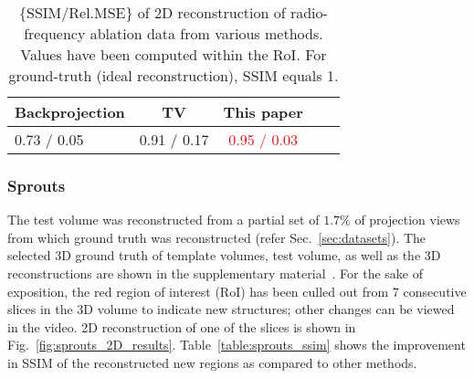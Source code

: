\documentclass[journal]{IEEEtran}
\begin{document}
\begin{comment}
\begin{figure}[!h]
\centering
\subcaptionbox{Test}{\fcolorbox{white}{green}{\texttt{[image: ../images/tmh/RFA2/post\_TCI/very\_few\_views/test\_zoomed.png]}}}\hfill
\subcaptionbox{Backprojection\\no prior}{\texttt{[image: ../images/tmh/RFA2/post\_TCI/very\_few\_views/fbp\_zoomed.png]}}\hfill
\subcaptionbox{TV, no prior}{\texttt{[image: ../images/tmh/RFA2/post\_TCI/very\_few\_views/tv\_zoomed.png]}}\hfill
\subcaptionbox{This paper}{\texttt{[image: ../images/tmh/RFA2/post\_TCI/very\_few\_views/weighted\_pca\_zoomed.png]}}
\caption{A zoomed-in version of the regions around the RoI of the reconstructions shown in Fig.~\ref{fig:tmh_2D_results}.}
\label{fig:tmh_2D_zoomed_results}
\end{figure}
\end{comment}

\begin{table}[!h]
  \centering
  \caption{\{SSIM/Rel.MSE\} of 2D reconstruction of radio-frequency ablation data from various methods. Values have been computed within the RoI. For ground-truth (ideal reconstruction), SSIM equals 1.}
\begin{tabular}{|l|c|c|c|c|}
\hline \textbf{Backprojection} & \textbf{TV} &
\textbf{This paper} \\ \hline  0.73 / 0.05
& 0.91 / 0.17 & \textcolor{red}{0.95 / 0.03} \\ \hline 
\end{tabular}
\label{table:tmh_ssim}
\end{table}



\subsubsection{\textbf{Sprouts}}
\label{Sec:sprouts_spatially_varying}

The test volume was reconstructed from a partial set of  
 $1.7\%$ of projection views
from which ground truth was reconstructed (refer
Sec.~\ref{sec:datasets}). The selected 3D ground truth of template
volumes, test volume, as well as the 3D reconstructions are shown in
the supplementary material~\cite{supp_paper}. For the sake of
exposition, the red region of interest (RoI) has been culled out from
7 consecutive slices in the 3D volume to indicate new structures;
other changes can be viewed in the video.  2D reconstruction of one of
the slices is shown in Fig.~\ref{fig:sprouts_2D_results}.
Table~\ref{table:sprouts_ssim} shows the improvement in SSIM of the
reconstructed new regions as compared to other methods.
\end{document}

